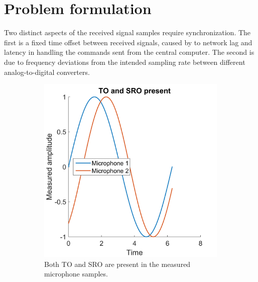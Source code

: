 \documentclass[a4paper, notitlepage]{report}
\begin{document}
\section{Problem formulation}
\label{sec:sro-problem}
Two distinct aspects of the received signal samples require synchronization. The first is a fixed time offset between received signals, caused by to network lag and latency in handling the commands sent from the central computer. The second is due to frequency deviations from the intended sampling rate between different analog-to-digital converters.

\begin{figure}[hbt]
\begin{adjustwidth}{-1in}{-1in}
\centering
	\begin{subfigure}{0.25\paperwidth}
		\includegraphics[width=\textwidth]{figures/sro-example/to-and-sro}
		\caption{Both TO and SRO are present in the measured microphone samples.}
		\label{fig:sync-ex1}
	\end{subfigure}
	~
	\begin{subfigure}{0.25\paperwidth}

\end{subfigure}
\end{adjustwidth}
\end{figure}
\end{document}
